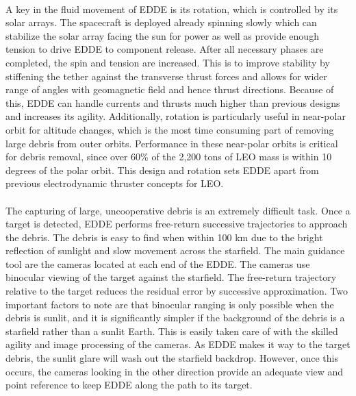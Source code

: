 \documentclass{article}
\theoremstyle{plain}			%
\theoremstyle{definition}		%
\theoremstyle{remark}
\numberwithin{equation}{section}
\numberwithin{figure}{section}
\numberwithin{table}{section}
\begin{document}
\\
A key in the fluid movement of EDDE is its rotation, which is controlled by its solar arrays. The spacecraft is deployed already spinning slowly which can stabilize the solar array facing the sun for power as well as provide enough tension to drive EDDE to component release.  After all necessary phases are completed, the spin and tension are increased. This is to improve stability by stiffening the tether against the transverse thrust forces and allows for wider range of angles with geomagnetic field and hence thrust directions. Because of this, EDDE can handle currents and thrusts much higher than previous designs and increases its agility. Additionally, rotation is particularly useful in near-polar orbit for altitude changes, which is the most time consuming part of removing large debris from outer orbits. Performance in these near-polar orbits is critical for debris removal, since over 60\% of the 2,200 tons of LEO mass is within 10 degrees of the polar orbit. This design and rotation sets EDDE apart from previous electrodynamic thruster concepts for LEO. \\
\\
The capturing of large, uncooperative debris is an extremely difficult task. Once a target is detected, EDDE performs free-return successive trajectories to approach the debris. The debris is easy to find when within 100 km due to the bright reflection of sunlight and slow movement across the starfield. The main guidance tool are the cameras located at each end of the EDDE.  The cameras use binocular viewing of the target against the starfield. The free-return trajectory relative to the target reduces the residual error by successive approximation. Two important factors to note are that binocular ranging is only possible when the debris is sunlit, and it is significantly simpler if the background of the debris is a starfield rather than a sunlit Earth. This is easily taken care of with the skilled agility and image processing of the cameras.  As EDDE makes it way to the target debris, the sunlit glare will wash out the starfield backdrop. However, once this occurs, the cameras looking in the other direction provide an adequate view and point reference to keep EDDE along the path to its target.\\
\\
\end{document}
